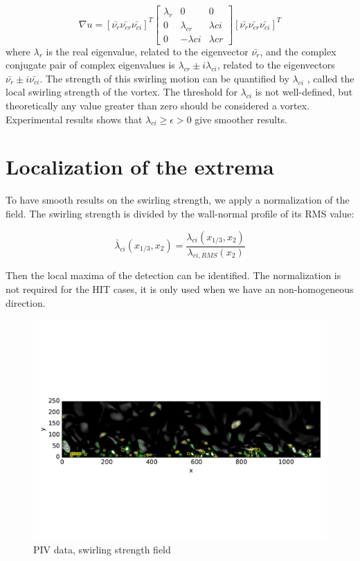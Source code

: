 \documentclass[12pt, a4paper, openany]{memoir}
\begin{document}
\begin{equation}
\nabla u = [\bar{\nu_r} \bar{\nu_{cr}} \bar{\nu_{ci}}]^T
\left[\begin{array}{ccc}
\lambda_r & 0 & 0 \\
0 & \lambda_{cr} & \lambda{ci} \\
0 & -\lambda{ci} & \lambda{cr} \end{array}\right]
[\bar{\nu_r} \bar{\nu_{cr}} \bar{\nu_{ci}}]^T
\end{equation} 
where $\lambda_r$ is the real eigenvalue, related to the eigenvector $\bar{\nu_r}$, and the complex conjugate pair of complex eigenvalues is $\lambda_{cr}  \pm i\lambda_{ci}$, related to the eigenvectors $\bar{\nu_r} \pm i\bar{\nu_{ci}}$. The strength of this swirling motion can be quantified by $\lambda_{ci}$ , called the local swirling strength of the vortex. The threshold for $\lambda_{ci}$ is not well-defined, but theoretically any value greater than zero should be considered a vortex. Experimental results \cite{zhou1999} shows that $\lambda_{ci} \geq \epsilon > 0$ give smoother results.


\section{Localization of the extrema}

To have smooth results on the swirling strength, we apply a normalization of the field. The swirling strength is divided by the wall-normal profile of its RMS value:

\begin{equation}
\bar{\lambda}_{ci}(x_{1/3},x_2) = \frac{\lambda_{ci}(x_{1/3},x_2)}{\lambda_{ci,RMS}(x_2)}
\end{equation}

Then the local maxima of the detection can be identified. The normalization is not required for the HIT cases, it is only used when we have an non-homogeneous direction.

\begin{figure}[h]
	\centering
	\includegraphics[trim=0 130 0 130 ,clip, width=\textwidth]{figure/PIVnonnormalized.pdf}
	\caption{PIV data, swirling strength field}
	\label{fig:nonnorm}
\end{figure}
\end{document}
